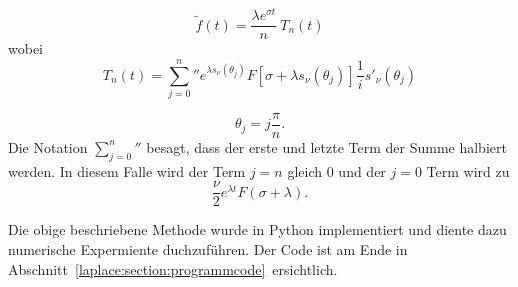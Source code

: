 \begin{equation}
\tilde{f}(t) = \frac{\lambda e^{\sigma t}}{n}~T_{n}(t)
\end{equation}
wobei 
\begin{equation}
T_{n}(t)
=
{\sum_{j=0}^n}'' e^{\lambda s_{\nu}(\theta_{j})}
F[\sigma + \lambda s_{\nu}(\theta_{j})]
\frac{1}{i} s'_{\nu}(\theta_{j})
\end{equation}

\begin{equation}
\theta_{j} = j \frac{\pi}{n}.
\end{equation}
Die Notation ${\sum_{j=0}^n}''$ besagt, dass der erste und letzte
Term der Summe halbiert werden.
In diesem Falle wird der Term $j=n$ gleich 0 und der $j=0$ Term wird zu
\begin{equation}
\frac{\nu}{2}e^{\lambda t}F(\sigma + \lambda).
\end{equation}


Die obige beschriebene Methode wurde in Python implementiert und diente dazu numerische Expermiente duchzuführen.
Der Code ist am Ende in Abschnitt~\ref{laplace:section:programmcode} ersichtlich. 

